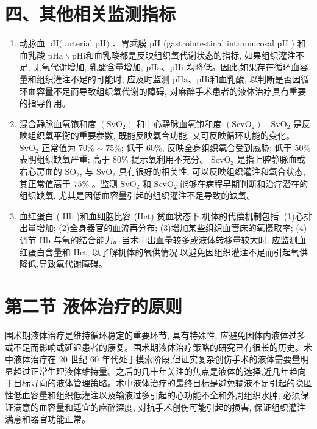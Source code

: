 \documentclass[10pt]{article}
\begin{document}
\section*{四、其他相关监测指标}
\begin{enumerate}
  \item 动脉血 $\mathrm{pH}($ arterial $\mathrm{pH})$ 、胃乘膜 $\mathrm{pH}$ (gastrointestinal intramucosal $\mathrm{pH}$ ) 和血乳酸 $\mathrm{pHa} \backslash \mathrm{pHi}$和血乳酸都是反映组织氧代谢状态的指标, 如果组织灌注不足, 无氧代谢增加, 乳酸含量增加, $\mathrm{pHa} 、 \mathrm{pHi}$ 均降低。因此,如果存在循环血容量和组织灌注不足的可能时, 应及时监测 $\mathrm{pHa} 、 \mathrm{pHi}$和血乳酸, 以判断是否因循环血容量不足而导致组织氧代谢的障碍, 对麻醉手术患者的液体治疗具有重要的指导作用。

  \item 混合静脉血氧饱和度 $\left(\mathrm{SvO}_{2}\right)$ 和中心静脉血氧饱和度 $\left(\mathrm{ScvO}_{2}\right) \quad \mathrm{SvO}_{2}$ 是反映组织氧平衡的重要参数, 既能反映氧合功能, 又可反映循环功能的变化。 $\mathrm{SvO}_{2}$ 正常值为 $70 \% \sim 75 \%$; 低于 $60 \%$, 反映全身组织氧合受到威胁; 低于 $50 \%$ 表明组织缺氧严重; 高于 $80 \%$ 提示氧利用不充分。 $\mathrm{ScvO}_{2}$ 是指上腔静脉血或右心房血的 $\mathrm{SO}_{2}$, 与 $\mathrm{SvO}_{2}$ 具有很好的相关性, 可以反映组织灌注和氧合状态, 其正常值高于 $75 \%$ 。监测 $\mathrm{SvO}_{2}$ 和 $\mathrm{ScvO}_{2}$ 能够在病程早期判断和治疗潜在的组织缺氧, 尤其是因低血容量引起的组织灌注不足导致的缺氧。

  \item 血红蛋白 ( $\mathrm{Hb}$ )和血细胞比容 (Hct) 贫血状态下,机体的代偿机制包括: (1)心排出量增加; (2)全身器官的血流再分布; (3)增加某些组织血管床的氧摄取率; (4)调节 $\mathrm{Hb}$ 与氧的结合能力。当术中出血量较多或液体转移量较大时, 应监测血红蛋白含量和 Hct, 以了解机体的氧供情况,以避免因组织灌注不足而引起氧供降低,导致氧代谢障碍。

\end{enumerate}

\section*{第二节 液体治疗的原则}
围术期液体治疗是维持循环稳定的重要环节, 具有特殊性, 应避免因体内液体过多或不足而影响或延迟患者的康复。围术期液体治疗策略的研究已有很长的历史。术中液体治疗在 20 世纪 60 年代处于摸索阶段,但证实复杂创伤手术的液体需要量明显超过正常生理液体维持量。之后的几十年关注的焦点是液体的选择,近几年趋向于目标导向的液体管理策略。术中液体治疗的最终目标是避免输液不足引起的隐匿性低血容量和组织低灌注以及输液过多引起的心功能不全和外周组织水肿; 必须保证满意的血容量和适宜的麻醉深度, 对抗手术创伤可能引起的损害, 保证组织灌注满意和器官功能正常。
\end{document}
